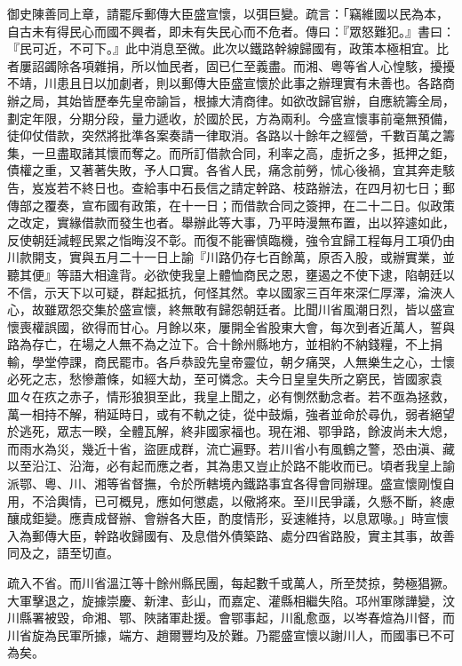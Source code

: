 \begin{pinyinscope}
御史陳善同上章，請罷斥郵傳大臣盛宣懷，以弭巨變。疏言：「竊維國以民為本，自古未有得民心而國不興者，即未有失民心而不危者。傳曰：『眾怒難犯。』書曰：『民可近，不可下。』此中消息至微。此次以鐵路幹線歸國有，政策本極相宜。比者屢詔蠲除各項雜捐，所以恤民者，固已仁至義盡。而湘、粵等省人心惶駭，擾擾不靖，川患且日以加劇者，則以郵傳大臣盛宣懷於此事之辦理實有未善也。各路商辦之局，其始皆歷奉先皇帝諭旨，根據大清商律。如欲改歸官辦，自應統籌全局，劃定年限，分期分段，量力遞收，於國於民，方為兩利。今盛宣懷事前毫無預備，徒仰仗借款，突然將批準各案奏請一律取消。各路以十餘年之經營，千數百萬之籌集，一旦盡取諸其懷而奪之。而所訂借款合同，利率之高，虛折之多，抵押之鉅，債權之重，又著著失敗，予人口實。各省人民，痛念前勞，怵心後禍，宜其奔走駭告，岌岌若不終日也。查給事中石長信之請定幹路、枝路辦法，在四月初七日；郵傳部之覆奏，宣布國有政策，在十一日；而借款合同之簽押，在二十二日。似政策之改定，實緣借款而發生也者。舉辦此等大事，乃平時漫無布置，出以猝遽如此，反使朝廷減輕民累之恉晦沒不彰。而復不能審慎臨機，強令宜歸工程每月工項仍由川款開支，實與五月二十一日上諭『川路仍存七百餘萬，原否入股，或辦實業，並聽其便』等語大相違背。必欲使我皇上體恤商民之恩，壅遏之不使下逮，陷朝廷以不信，示天下以可疑，群起抵抗，何怪其然。幸以國家三百年來深仁厚澤，淪浹人心，故雖眾怨交集於盛宣懷，終無敢有歸怨朝廷者。比聞川省風潮日烈，皆以盛宣懷喪權誤國，欲得而甘心。月餘以來，屢開全省股東大會，每次到者近萬人，誓與路為存亡，在場之人無不為之泣下。合十餘州縣地方，並相約不納錢糧，不上捐輸，學堂停課，商民罷市。各戶恭設先皇帝靈位，朝夕痛哭，人無樂生之心，士懷必死之志，愁慘蕭條，如經大劫，至可憐念。夫今日皇皇失所之窮民，皆國家袁皿々在疚之赤子，情形狼狽至此，我皇上聞之，必有惻然動念者。若不亟為拯救，萬一相持不解，稍延時日，或有不軌之徒，從中鼓煽，強者並命於尋仇，弱者絕望於逃死，眾志一睽，全體瓦解，終非國家福也。現在湘、鄂爭路，餘波尚未大熄，而雨水為災，幾近十省，盜匪成群，流亡遍野。若川省小有風鶴之警，恐由滇、藏以至沿江、沿海，必有起而應之者，其為患又豈止於路不能收而已。頃者我皇上諭派鄂、粵、川、湘等省督撫，令於所轄境內鐵路事宜各得會同辦理。盛宣懷剛愎自用，不洽輿情，已可概見，應如何懲處，以儆將來。至川民爭議，久懸不斷，終慮釀成鉅變。應責成督辦、會辦各大臣，酌度情形，妥速維持，以息眾喙。」時宣懷入為郵傳大臣，幹路收歸國有、及息借外債築路、處分四省路股，實主其事，故善同及之，語至切直。

疏入不省。而川省溫江等十餘州縣民團，每起數千或萬人，所至焚掠，勢極猖獗。大軍擊退之，旋據崇慶、新津、彭山，而嘉定、灌縣相繼失陷。邛州軍隊譁變，汶川縣署被毀，命湘、鄂、陜諸軍赴援。會鄂事起，川亂愈亟，以岑春煊為川督，而川省旋為民軍所據，端方、趙爾豐均及於難。乃罷盛宣懷以謝川人，而國事已不可為矣。


\end{pinyinscope}
